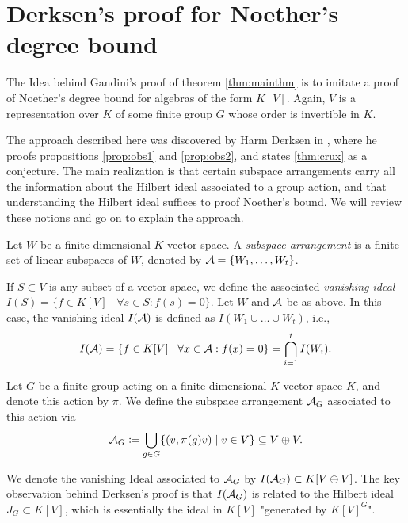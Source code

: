 \documentclass[../main.tex]{subfiles}
\begin{document}
\section{Derksen's proof for Noether's degree bound}
The Idea behind Gandini's proof of theorem \ref{thm:mainthm} is to
imitate a proof of Noether's degree bound for algebras of the form 
$K[V]$. Again, $V$ is a representation over $K$ of some finite group $G$
whose order is invertible in $K$. 


The approach described here was discovered by Harm Derksen in
\cite{DERKSENProofIdea}, where he proofs propositions \ref{prop:obs1} and 
\ref{prop:obs2}, and states \ref{thm:crux} as a conjecture. The main realization is
that certain subspace arrangements carry all the information about the Hilbert ideal
associated to a group action, and that understanding the Hilbert ideal suffices to
proof Noether's bound. We will review these notions and go on to explain the 
approach.

\begin{defi}
    Let $W$ be a finite dimensional $K$-vector space. A \emph{subspace
    arrangement} is a finite set of linear subspaces of $W$, denoted by $\mathcal{A} =
    \{W_1, \dots, W_t\}$. 
\end{defi}

\begin{defi}
    If $S \subset V$ is any subset of a vector space, we define the associated
    \emph{vanishing ideal}
    $I(S) = \{f \in K[V] \mid \forall s \in S: f(s) = 0\}$.
    Let $W$ and $\mathcal{A}$ be as above. In this case, the vanishing ideal $I(\mathcal{A})$
    is defined as $I(W_1 \cup \dots \cup W_t)$, i.e.,
    \begin{equation*}
        I(\mathcal{A}) = \{f \in K[V] \mid \forall x \in \mathcal{A}: f(x) = 0\} =
        \bigcap_{i=1}^t I(W_i).
    \end{equation*}
\end{defi}

\begin{defi}
    Let $G$ be a finite group acting on a finite dimensional $K$ vector space $K$, 
    and denote this action by $\pi$.
    We define the subspace arrangement $\mathcal{A}_G$ associated to this action via
    \begin{equation*}
        \mathcal{A}_G \coloneqq \bigcup_{g \in G}\{(v,\pi(g)v) \mid v \in V\}
        \subseteq V \oplus V.
    \end{equation*}
\end{defi}
We denote the vanishing Ideal associated to $\mathcal{A}_G$ by $I(\mathcal{A}_G) \subset K[V \oplus V]$. 
The key observation behind Derksen's proof is that $I(\mathcal{A}_G)$ is related to the Hilbert ideal
$J_G \subset K[V]$, which is essentially the ideal in $K[V]$ "generated by $K[V]^G$".
\end{document}
